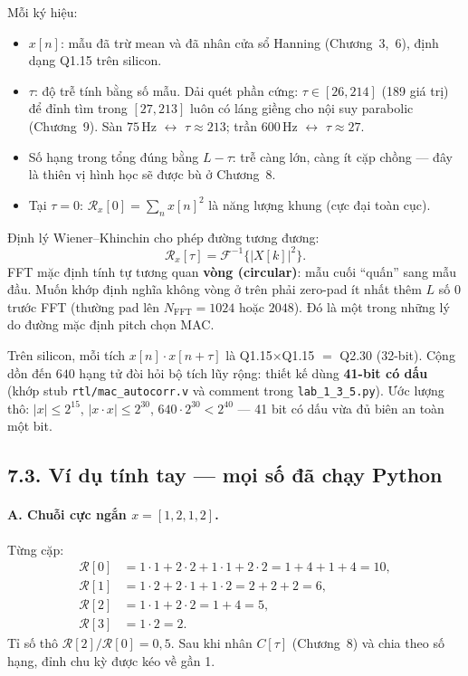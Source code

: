 Mỗi ký hiệu:
\begin{itemize}[leftmargin=1.4em]
\item $x[n]$: mẫu đã trừ mean và đã nhân cửa sổ Hanning (Chương~3,~6), định dạng Q1.15 trên silicon.
\item $\tau$: độ trễ tính bằng số mẫu. Dải quét phần cứng: $\tau \in [26,214]$ (189 giá trị) để đỉnh tìm trong $[27,213]$ luôn có láng giềng cho nội suy parabolic (Chương~9). Sàn $75\,\text{Hz}$ $\leftrightarrow$ $\tau\approx 213$; trần $600\,\text{Hz}$ $\leftrightarrow$ $\tau\approx 27$.
\item Số hạng trong tổng đúng bằng $L-\tau$: trễ càng lớn, càng ít cặp chồng --- đây là thiên vị hình học sẽ được bù ở Chương~8.
\item Tại $\tau=0$: $\mathcal{R}_x[0] = \sum_n x[n]^2$ là năng lượng khung (cực đại toàn cục).
\end{itemize}

Định lý Wiener--Khinchin cho phép đường tương đương:
\[
\mathcal{R}_x[\tau] = \mathcal{F}^{-1}\{|X[k]|^2\}.
\]
FFT mặc định tính tự tương quan \textbf{vòng (circular)}: mẫu cuối ``quấn'' sang mẫu đầu. Muốn khớp định nghĩa không vòng ở trên phải zero-pad ít nhất thêm $L$ số 0 trước FFT (thường pad lên $N_{\mathrm{FFT}}=1024$ hoặc $2048$). Đó là một trong những lý do đường mặc định pitch chọn MAC.

Trên silicon, mỗi tích $x[n]\cdot x[n+\tau]$ là Q1.15$\times$Q1.15 $=$ Q2.30 (32-bit). Cộng dồn đến $640$ hạng tử đòi hỏi bộ tích lũy rộng: thiết kế dùng \textbf{41-bit có dấu} (khớp stub \texttt{rtl/mac\_autocorr.v} và comment trong \texttt{lab\_1\_3\_5.py}). Ước lượng thô: $|x|\le 2^{15}$, $|x\cdot x|\le 2^{30}$, $640\cdot 2^{30} < 2^{40}$ --- 41 bit có dấu vừa đủ biên an toàn một bit.

\subsection*{7.3. Ví dụ tính tay --- mọi số đã chạy Python}

\paragraph{A. Chuỗi cực ngắn $x = [1,2,1,2]$.}
Từng cặp:
\begin{align*}
\mathcal{R}[0] &= 1\cdot 1 + 2\cdot 2 + 1\cdot 1 + 2\cdot 2 = 1+4+1+4 = 10,\\
\mathcal{R}[1] &= 1\cdot 2 + 2\cdot 1 + 1\cdot 2 = 2+2+2 = 6,\\
\mathcal{R}[2] &= 1\cdot 1 + 2\cdot 2 = 1+4 = 5,\\
\mathcal{R}[3] &= 1\cdot 2 = 2.
\end{align*}
Tỉ số thô $\mathcal{R}[2]/\mathcal{R}[0] = 0{,}5$. Sau khi nhân $C[\tau]$ (Chương~8) và chia theo số hạng, đỉnh chu kỳ được kéo về gần 1.

